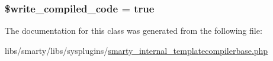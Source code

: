 \subsubsection[{\$write\+\_\+compiled\+\_\+code}]{\setlength{\rightskip}{0pt plus 5cm}\$write\+\_\+compiled\+\_\+code = true}\label{class_smarty___internal___template_compiler_base_a5e7d998d12b28a7a21ba0fe0de6238d6}


The documentation for this class was generated from the following file\+:\begin{DoxyCompactItemize}
\item 
libs/smarty/libs/sysplugins/\hyperlink{smarty__internal__templatecompilerbase_8php}{smarty\+\_\+internal\+\_\+templatecompilerbase.\+php}\end{DoxyCompactItemize}
